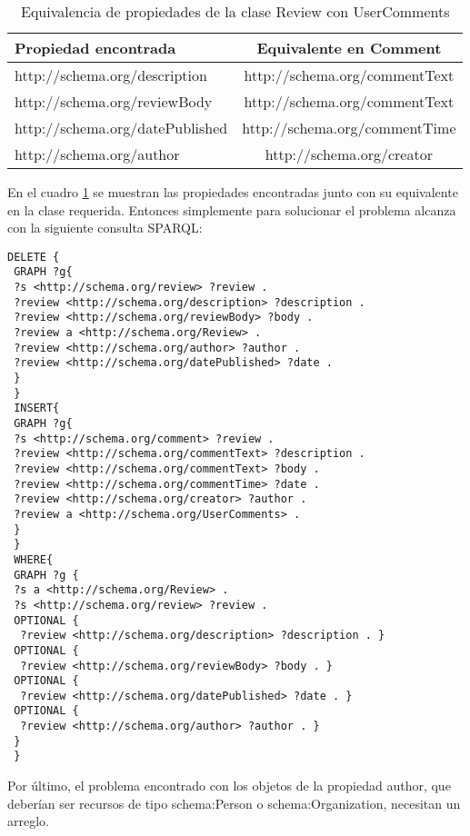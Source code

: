 \begin{table}[h]
\begin{tabular}{| l | c |} \hline
Propiedad encontrada & Equivalente en Comment\\\hline
http://schema.org/description & http://schema.org/commentText \\
http://schema.org/reviewBody & http://schema.org/commentText \\
http://schema.org/datePublished & http://schema.org/commentTime \\
http://schema.org/author & http://schema.org/creator \\\hline
\end{tabular}
\caption{Equivalencia de propiedades de la clase Review con UserComments}
\label{table:PropertyEqRevCom}
\end{table}

En el cuadro \ref{table:PropertyEqRevCom} se muestran las propiedades encontradas junto con su equivalente en la clase requerida. 
Entonces simplemente para solucionar el problema alcanza con la siguiente consulta SPARQL:\\
\begin{lstlisting}[frame=single]
 DELETE { 
 GRAPH ?g{ 
 ?s <http://schema.org/review> ?review .
 ?review <http://schema.org/description> ?description .
 ?review <http://schema.org/reviewBody> ?body .
 ?review a <http://schema.org/Review> .
 ?review <http://schema.org/author> ?author . 
 ?review <http://schema.org/datePublished> ?date .
 } 
 } 
 INSERT{ 
 GRAPH ?g{ 
 ?s <http://schema.org/comment> ?review .
 ?review <http://schema.org/commentText> ?description .
 ?review <http://schema.org/commentText> ?body .
 ?review <http://schema.org/commentTime> ?date .
 ?review <http://schema.org/creator> ?author .
 ?review a <http://schema.org/UserComments> .
 }
 }
 WHERE{
 GRAPH ?g {
 ?s a <http://schema.org/Review> .
 ?s <http://schema.org/review> ?review .
 OPTIONAL {
  ?review <http://schema.org/description> ?description . }
 OPTIONAL {
  ?review <http://schema.org/reviewBody> ?body . }
 OPTIONAL {
  ?review <http://schema.org/datePublished> ?date . }
 OPTIONAL {
  ?review <http://schema.org/author> ?author . }
 }
 }
\end{lstlisting}

Por último, el problema encontrado con los objetos de la propiedad author, que deberían ser recursos de tipo schema:Person o schema:Organization, 
necesitan un arreglo.
